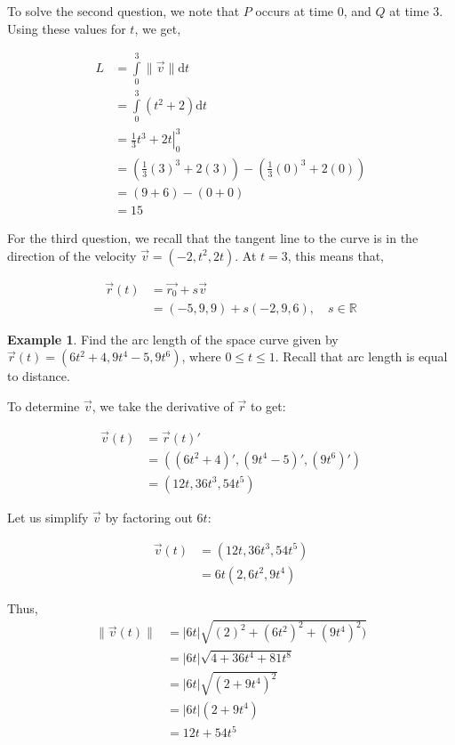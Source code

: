 \documentclass[11pt]{article}
\theoremstyle{plain} %
\theoremstyle{definition}
\theoremstyle{example}
\newtheorem*{example}{Example}
\theoremstyle{remark}
\begin{document}
To solve the second question, we note that $P$ occurs at time 0, and $Q$ at time 3. Using these values for $t$, we get,

\begin{align*}
L &=  \int\limits_{0}^{3}\|\vec{v}\| \mathrm d t\\
&=  \int\limits_{0}^{3}(t^2+2)\mathrm d t\\
&=\left.\frac{1}{3}t^3+2t\right|_0^3\\
&= \left(\frac{1}{3}(3)^3 + 2(3)\right) - \left(\frac{1}{3}(0)^3 + 2(0)\right)\\
&= \left(9+6\right)-\left(0+0\right)\\
&= 15
\end{align*}


For the third question, we recall that the tangent line to the curve is in the direction of the velocity $\vec{v} = (-2, t^2, 2t)$. At $t = 3$, this means that,

\begin{align*}
	\vec{r}(t) &= \vec{r_0} + s\vec{v}\\
	&= (-5, 9, 9) + s (-2, 9, 6), \quad s \in \mathbb R
\end{align*}

\begin{example}

Find the arc length of the space curve given by $\vec{r}(t) = \left(6t^2+4, 9t^4-5, 9t^6\right)$, where $0\leq t\leq1$.
Recall that arc length is equal to distance.
\end{example}
To determine $\vec{v}$, we take the derivative of $\vec{r}$ to get:

\begin{align*}
	\vec{v}(t) &= \vec{r}(t)'\\
	&= \left(\left(6t^2+4\right)',\left(9t^4-5\right)',(9t^6)'\right)\\
	&= \left(12t, 36t^3, 54t^5\right)
\end{align*}

Let us simplify $\vec{v}$ by factoring out $6t$:

\begin{align*}
	\vec{v}(t) &= \left(12t, 36t^3, 54t^5\right)\\
	&= 6t\left(2, 6t^2, 9t^4\right)
\end{align*}



Thus,
\begin{align*}
	\|\vec{v}(t)\| &= |6t|\sqrt{(2)^2+\left(6t^2\right)^2+\left(9t^4\right)^2)}\\
	&= |6t|\sqrt{4+36t^4+81t^8}\\
	&=|6t|\sqrt{\left(2+9t^4\right)^2}\\
	&= |6t|\left(2+9t^4\right)\\
	&= 12t+54t^5
\end{align*}
\end{document}
